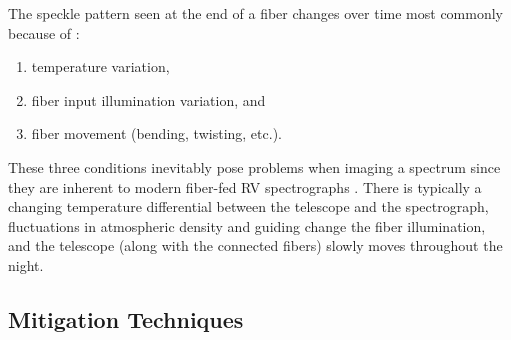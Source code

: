 The speckle pattern seen at the end of a fiber changes over time most commonly because of \citep{epworth_phenomenon_1978}:
\begin{enumerate}
\item temperature variation,
\item fiber input illumination variation, and
\item fiber movement (bending, twisting, etc.).
\end{enumerate}
These three conditions inevitably pose problems when imaging a spectrum since they are inherent to modern fiber-fed RV spectrographs \citep{baudrand_modal_2001, mahadevan_suppression_2014}. There is typically a changing temperature differential between the telescope and the spectrograph, fluctuations in atmospheric density and guiding change the fiber illumination, and the telescope (along with the connected fibers) slowly moves throughout the night.

\subsection{Mitigation Techniques}
\label{modal-noise:mn:mitigation}

